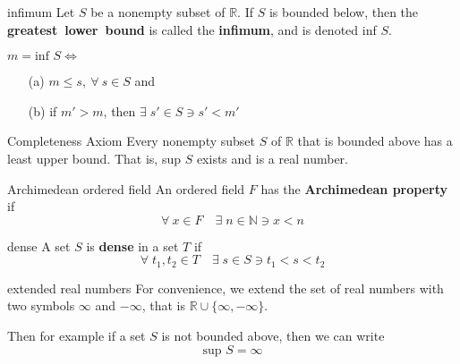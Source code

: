 \documentclass[avery5371,grid]{flashcards}
\newcommand{\N}{\mathbb{N}}
\newcommand{\R}{\mathbb{R}}
\begin{document}
\begin{flashcard}[Definition]{infimum}
Let $S$ be a nonempty subset of $\R$.  If $S$ is bounded below, then
the \mbox{\textbf{greatest lower bound}} is called the
\mbox{\textbf{infimum}}, and is denoted inf $S$.

\medskip
$m = \textrm{inf } S \Leftrightarrow$
\begin{enumerate}
 \item[(a)] $m \leq s, \ \forall \ s \in S$ and
 \item[(b)] if $m'>m$, then $\exists \; s' \in S \ni s'<m'$
\end{enumerate}
\end{flashcard}

\begin{flashcard}[Axiom]{Completeness Axiom}
Every nonempty subset $S$ of $\R$ that is bounded above has a 
least upper bound.  That is, sup $S$ exists and is a real number.
\end{flashcard}

\begin{flashcard}[Definition]{Archimedean ordered field}
An ordered field $F$ has the \textbf{Archimedean property} 
if 
\begin{equation*}
\forall \ x \in F \quad \exists \; n \in \N \ni x<n
\end{equation*}
\end{flashcard}

\begin{flashcard}[Definition]{dense}
A set $S$ is \textbf{dense} in a set $T$ if
\begin{equation*}
\forall \; t_1, t_2 \in T \quad \exists \; s \in S \ni t_1<s<t_2
\end{equation*}
\end{flashcard}

\begin{flashcard}[Definition]{extended real numbers}
For convenience, we extend the set of real numbers with two symbols
$\infty$ and $-\infty$, that is $\R \cup \{ \infty , -\infty \}$. 

\bigskip
Then for example if a set $S$ is not bounded above, then we can write
\begin{equation*}
\textrm{sup } S = \infty
\end{equation*}
\end{flashcard}
\end{document}
